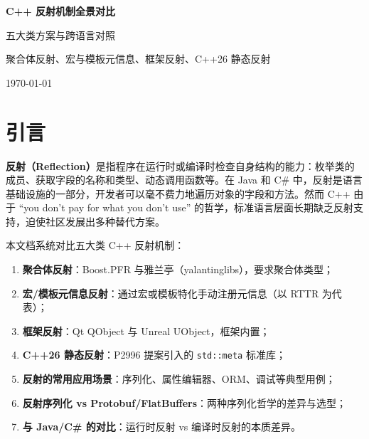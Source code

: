 \documentclass[12pt,a4paper,fontset=fandol]{ctexbook}
\begin{document}
\frontmatter

\begin{titlepage}
\centering
\vspace*{4cm}
{\Huge\bfseries C++ 反射机制全景对比\par}
\vspace{1cm}
{\LARGE 五大类方案与跨语言对照\par}
\vspace{0.4cm}
{\Large 聚合体反射、宏与模板元信息、框架反射、C++26 静态反射\par}
\vfill
{\large \today\par}
\end{titlepage}

\tableofcontents

\mainmatter

\cleardoublepage

\section{引言}\label{sec:intro}

\textbf{反射（Reflection）}是指程序在运行时或编译时检查自身结构的能力：枚举类的成员、获取字段的名称和类型、动态调用函数等。在 Java 和 C\# 中，反射是语言基础设施的一部分，开发者可以毫不费力地遍历对象的字段和方法。然而 C++ 由于 ``you don't pay for what you don't use'' 的哲学，标准语言层面长期缺乏反射支持，迫使社区发展出多种替代方案。

本文档系统对比五大类 C++ 反射机制：

\begin{enumerate}[label=\textbf{(\arabic*)},itemsep=2pt]
  \item \textbf{聚合体反射}：Boost.PFR 与雅兰亭（yalantinglibs），要求聚合体类型；
  \item \textbf{宏/模板元信息反射}：通过宏或模板特化手动注册元信息（以 RTTR 为代表）；
  \item \textbf{框架反射}：Qt QObject 与 Unreal UObject，框架内置；
  \item \textbf{C++26 静态反射}：P2996 提案引入的 \texttt{std::meta} 标准库；
  \item \textbf{反射的常用应用场景}：序列化、属性编辑器、ORM、调试等典型用例；
  \item \textbf{反射序列化 vs Protobuf/FlatBuffers}：两种序列化哲学的差异与选型；
  \item \textbf{与 Java/C\# 的对比}：运行时反射 vs 编译时反射的本质差异。
\end{enumerate}
\end{document}
